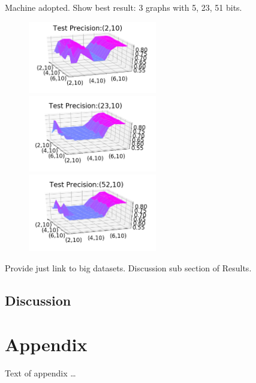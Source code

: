 \documentclass[sigplan,review,anonymous=false]{acmart}\settopmatter{printfolios=true,printccs=false,printacmref=false}
\begin{document}
Machine adopted.
Show best result: 3 graphs with 5, 23, 51 bits.
\begin{figure}[H]
	\includegraphics[width=0.5\textwidth]{210}
	\includegraphics[width=0.5\textwidth]{2310}
	\includegraphics[width=0.5\textwidth]{5210}
\end{figure}

Provide just link to big datasets. 
Discussion sub section of Results.
\subsection{Discussion}






\appendix
\section{Appendix}

Text of appendix \ldots
\end{document}
